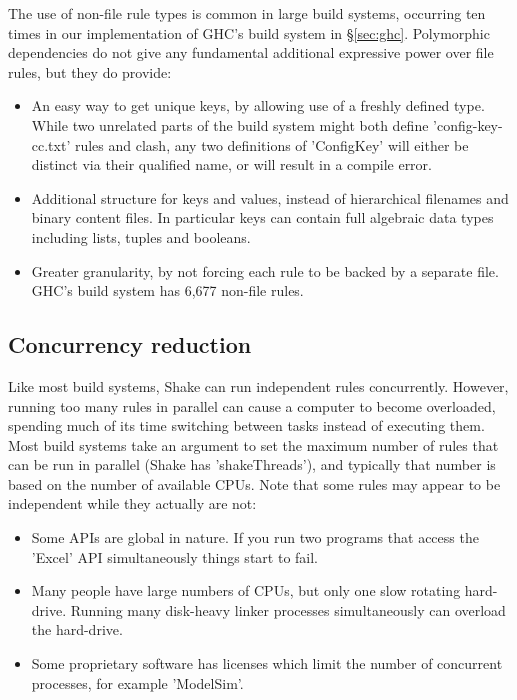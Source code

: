 The use of non-file rule types is common in large build systems, occurring ten
times in our implementation of GHC's build system in \S\ref{sec:ghc}.
Polymorphic dependencies do not give any fundamental additional expressive power
over file rules, but they do provide:

\begin{itemize}
\item An easy way to get unique keys, by allowing use of a freshly defined type.
While two unrelated parts of the build system might both define
\lst'config-key-cc.txt' rules and clash, any two definitions of \lst'ConfigKey'
will either be distinct via their qualified name, or will result in a compile
error.
\item Additional structure for keys and values, instead of hierarchical
filenames and binary content files. In particular keys can contain full
algebraic data types including lists, tuples and booleans.
\item Greater granularity, by not forcing each rule to be backed by a separate
file. GHC's build system has 6,677 non-file rules.
\end{itemize}
 
\subsection{Concurrency reduction}

Like most build systems, Shake can run independent rules concurrently.
However, running too many rules in parallel can cause a computer to become overloaded,
spending much of its time switching between tasks instead of executing them.
Most build systems take an argument to set the maximum number of rules that can
be run in parallel (Shake has \lst'shakeThreads'), and typically that number
is based on the number of available CPUs. Note that some rules may appear to be
independent while they actually are not:


\begin{itemize}
\item Some APIs are global in nature. If you run two programs that access the
\lst'Excel' API simultaneously things start to fail.
\item Many people have large numbers of CPUs, but only one slow rotating
hard-drive. Running many disk-heavy linker processes simultaneously can overload
the hard-drive.
\item Some proprietary software has licenses which limit the number of
concurrent processes, for example \lst'ModelSim'.
\end{itemize}

